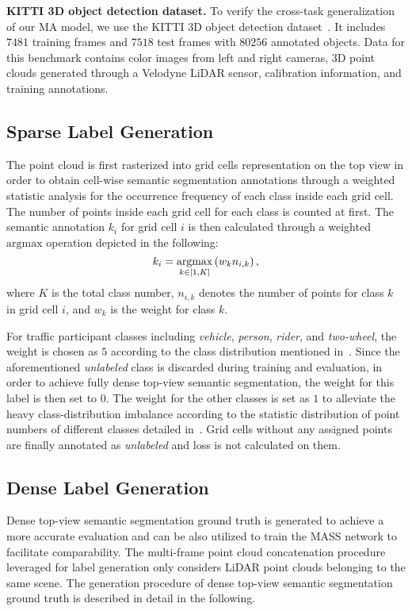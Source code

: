 \documentclass[lettersize,journal]{IEEEtran}
\begin{document}
\textbf{KITTI 3D object detection dataset.}
To verify the cross-task generalization of our MA model, we use the KITTI 3D object detection dataset~\cite{kitti}.
It includes $7481$ training frames and $7518$ test frames with $80256$ annotated objects.
Data for this benchmark contains color images from left and right cameras, 3D point clouds  generated through a Velodyne LiDAR sensor, calibration information, and training annotations.

\subsection{Sparse Label Generation}
The point cloud is first rasterized into grid cells representation on the top view in order to obtain cell-wise semantic segmentation annotations through a weighted statistic analysis for the occurrence frequency of each class inside each grid cell. The number of points inside each grid cell for each class is counted at first.
The semantic annotation $k_i$ for grid cell $i$ is then calculated through a weighted $\mathrm{argmax}$ operation depicted in the following:
\begin{equation}
\label{eq:argmax}
\centering
k_{i} = \underset{k\in[1,K]}{\mathrm{argmax}} \left( w_k  n_{i,k}\right),
\end{equation}
where $K$ is the total class number, $n_{i,k}$ denotes the number of points for class $k$ in grid cell $i$, and $w_k$ is the weight for class $k$.

For traffic participant classes including \emph{vehicle}, \emph{person}, \emph{rider}, and \emph{two-wheel}, the weight is chosen as $5$ according to the class distribution mentioned in~\cite{bieder2020exploiting}.
Since the aforementioned \emph{unlabeled} class is discarded during training and evaluation, in order to achieve fully dense top-view semantic segmentation, the weight for this label is then set to $0$.
The weight for the other classes is set as $1$ to alleviate the heavy class-distribution imbalance according to the statistic distribution of point numbers of different classes detailed in~\cite{bieder2020exploiting}.
Grid cells without any assigned points are finally annotated as \emph{unlabeled} and loss is not calculated on them.

\subsection{Dense Label Generation}
Dense top-view semantic segmentation ground truth is generated to achieve a more accurate evaluation and can be also utilized to train the MASS network to facilitate comparability.
The multi-frame point cloud concatenation procedure leveraged for label generation only considers LiDAR point clouds belonging to the same scene. The generation procedure of dense top-view semantic segmentation ground truth is described in detail in the following.
\end{document}
